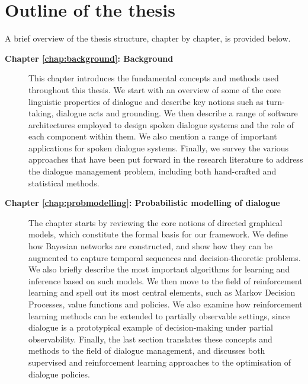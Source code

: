 
\section{Outline of the thesis}

A brief overview of the thesis structure, chapter by chapter, is provided below. 

\begin{description}
  \item[\textbf{Chapter \ref{chap:background}: Background}] \hfill  \vspace{2mm}
  
This chapter introduces the fundamental concepts and methods used throughout this thesis. We start with an overview of some of the core linguistic properties of dialogue and describe key notions such as turn-taking, dialogue acts and grounding.  We then describe a range of software architectures employed to design spoken dialogue systems and the role of each component within them.  We also mention a range of important applications for spoken dialogue systems. Finally, we survey the various approaches that have been put forward in the research literature to address the dialogue management problem, including both hand-crafted and statistical methods. \vspace{2mm}

  \item[\textbf{Chapter \ref{chap:probmodelling}: Probabilistic modelling of dialogue}] \hfill \vspace{2mm}

 The chapter starts by reviewing the core notions of directed graphical models, which constitute the formal basis for our framework.  We define how Bayesian networks are constructed, and show how they can be augmented to capture temporal sequences and decision-theoretic problems. We also briefly describe the most important algorithms for learning and inference based on such models.  We then  move to the field of reinforcement learning and spell out its most central elements, such as Markov Decision Processes, value functions and policies. We also examine how reinforcement learning methods can be extended to partially observable settings, since dialogue is a prototypical example of decision-making under partial observability.  Finally, the last section translates these concepts and methods to the field of dialogue management, and discusses both supervised and reinforcement learning approaches to the optimisation of dialogue policies.
 

\end{description}
